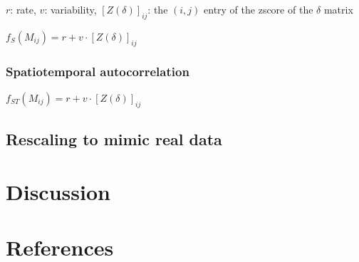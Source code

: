 \documentclass[11pt]{article}
\begin{document}
\(r\): rate, \(v\): variability, \([Z(\delta)]_{ij}\): the \((i,j)\)
entry of the zscore of the \(\delta\) matrix

\(f_{S}(M_{ij}) = r + v \cdot [Z(\delta)]_{ij}\)

\hypertarget{spatiotemporal-autocorrelation}{%
\subsubsection{Spatiotemporal
autocorrelation}\label{spatiotemporal-autocorrelation}}

\(f_{ST}(M_{ij}) = r + v \cdot [Z(\delta)]_{ij}\)

\hypertarget{rescaling-to-mimic-real-data}{%
\subsection{Rescaling to mimic real
data}\label{rescaling-to-mimic-real-data}}

\hypertarget{discussion}{%
\section{Discussion}\label{discussion}}

\hypertarget{references}{%
\section{References}\label{references}}
\end{document}
